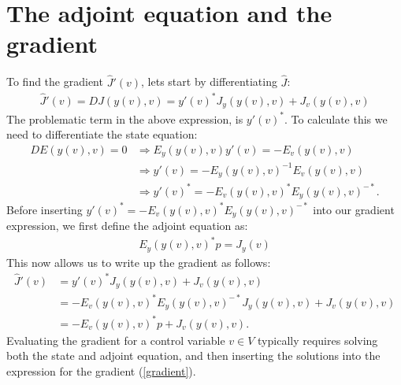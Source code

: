 \section{The adjoint equation and the gradient}
To find the gradient $\hat{J}'(v)$, lets start by differentiating $\hat J$:
\begin{align*}
\hat{J}'(v) = DJ(y(v),v) = y'(v)^*J_y(y(v),v) + J_v(y(v),v)
\end{align*}
The problematic term in the above expression, is $y'(v)^*$. To calculate this we need to differentiate the state equation:
\begin{align*}
DE(y(v),v)=0 &\Rightarrow E_y(y(v),v)y'(v)=-E_v(y(v),v) \\ &\Rightarrow y'(v)=-E_y(y(v),v)^{-1}E_v(y(v),v) \\ &\Rightarrow y'(v)^* = -E_v(y(v),v)^*E_y(y(v),v)^{-*}.
\end{align*}
Before inserting $y'(v)^* = -E_v(y(v),v)^*E_y(y(v),v)^{-*}$ into our gradient expression, we first define the adjoint equation as:
\begin{align}
E_y(y(v),v)^{*}p=J_y(v) \label{general adjoint}
\end{align}
This now allows us to write up the gradient as follows:
\begin{align}
\hat{J}'(v)&= y'(v)^*J_y(y(v),v) + J_v(y(v),v)\\
&=-E_v(y(v),v)^*E_y(y(v),v)^{-*}J_y(y(v),v) + J_v(y(v),v) \\
&= -E_v(y(v),v)^*p +J_v(y(v),v). \label{gradient}
\end{align}
Evaluating the gradient for a control variable $v\in V$ typically requires solving both the state and adjoint equation, and then inserting the solutions into the expression for the gradient (\ref{gradient}).
